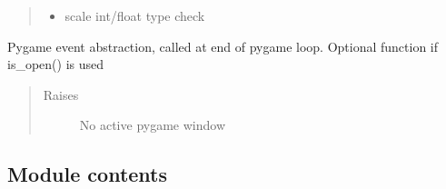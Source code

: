 \documentclass[letterpaper,10pt,english]{sphinxmanual}
\begin{document}
\begin{fulllineitems}
\begin{fulllineitems}
\begin{quote}
\begin{description}
\begin{itemize}
\item {} 
\sphinxAtStartPar
{} \textendash{} scale int/float type check

\end{itemize}

\end{description}\end{quote}

\end{fulllineitems}


\begin{fulllineitems}
\label{\detokenize{dpav:dpav.window.Window.update}}
\pysigstartsignatures
{}
\pysigstopsignatures
\sphinxAtStartPar
Pygame event abstraction, called at end of pygame loop.
Optional function if is\_open() is used
\begin{quote}\begin{description}
\item[{Raises}] \leavevmode
\sphinxAtStartPar
{} \textendash{} No active pygame window

\end{description}\end{quote}

\end{fulllineitems}


\end{fulllineitems}



\subsection{Module contents}
\label{\detokenize{dpav:module-dpav}}\label{\detokenize{dpav:module-contents}}
\end{document}
